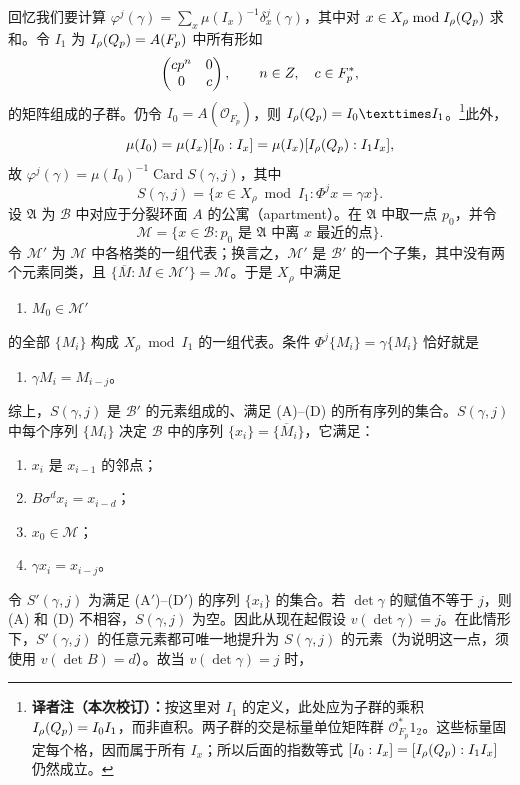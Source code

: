 回忆我们要计算
$\varphi^j(\gamma)=\sum_x\mu(I_x)^{-1}\delta_x^j(\gamma)$，其中对 $x\in X_\rho\bmod I_\rho(Q_p)$ 求和。令 $I_1$ 为 $I_\rho(Q_p)=A(F_p)$ 中所有形如
\[
\begin{pmatrix}cp^n&0\\0&c\end{pmatrix},\qquad n\in Z,\quad c\in F_p^*,
\]
的矩阵组成的子群。仍令 $I_0=A(\mathcal O_{F_p})$，则
$I_\rho(\Q_p)=I_0\times I_1$。\footnote{\textbf{译者注（本次校订）：}按这里对 $I_1$ 的定义，此处应为子群的乘积 $I_\rho(Q_p)=I_0I_1$，而非直积。两子群的交是标量单位矩阵群 $\mathcal O_{F_p}^*1_2$。这些标量固定每个格，因而属于所有 $I_x$；所以后面的指数等式 $[I_0:I_x]=[I_\rho(Q_p):I_1I_x]$ 仍然成立。}此外，
\[
\mu(I_0)=\mu(I_x)[I_0:I_x]=\mu(I_x)[I_\rho(Q_p):I_1I_x],
\]
故 $\varphi^j(\gamma)=\mu(I_0)^{-1}\operatorname{Card}S(\gamma,j)$，其中
\[
S(\gamma,j)=\{x\in X_\rho\bmod I_1:\Phi^jx=\gamma x\}.
\]
设 $\mathfrak A$ 为 $\mathcal B$ 中对应于分裂环面 $A$ 的公寓（apartment）。在 $\mathfrak A$ 中取一点 $p_0$，并令
\[
\mathcal M=\{x\in\mathcal B:p_0\text{ 是 }\mathfrak A\text{ 中离 }x\text{ 最近的点}\}.
\]
令 $\mathcal M'$ 为 $\mathcal M$ 中各格类的一组代表；换言之，$\mathcal M'$ 是 $\mathcal B'$ 的一个子集，其中没有两个元素同类，且
$\{\overline M:M\in\mathcal M'\}=\mathcal M$。于是 $X_\rho$ 中满足
\begin{enumerate}\item[(C)] $M_0\in\mathcal M'$\end{enumerate}
的全部 $\{M_i\}$ 构成 $X_\rho\bmod I_1$ 的一组代表。条件
$\Phi^j\{M_i\}=\gamma\{M_i\}$ 恰好就是
\begin{enumerate}\item[(D)] $\gamma M_i=M_{i-j}$。\end{enumerate}
综上，$S(\gamma,j)$ 是 $\mathcal B'$ 的元素组成的、满足 (A)--(D) 的所有序列的集合。$S(\gamma,j)$ 中每个序列 $\{M_i\}$ 决定 $\mathcal B$ 中的序列 $\{x_i\}=\{\overline M_i\}$，它满足：
\begin{enumerate}
\item[(A$'$)] $x_i$ 是 $x_{i-1}$ 的邻点；
\item[(B$'$)] $B\sigma^dx_i=x_{i-d}$；
\item[(C$'$)] $x_0\in\mathcal M$；
\item[(D$'$)] $\gamma x_i=x_{i-j}$。
\end{enumerate}
令 $S'(\gamma,j)$ 为满足 (A$'$)--(D$'$) 的序列 $\{x_i\}$ 的集合。若 $\det\gamma$ 的赋值不等于 $j$，则 (A) 和 (D) 不相容，$S(\gamma,j)$ 为空。因此从现在起假设 $v(\det\gamma)=j$。在此情形下，$S'(\gamma,j)$ 的任意元素都可唯一地提升为 $S(\gamma,j)$ 的元素（为说明这一点，须使用 $v(\det B)=d$）。故当 $v(\det\gamma)=j$ 时，
